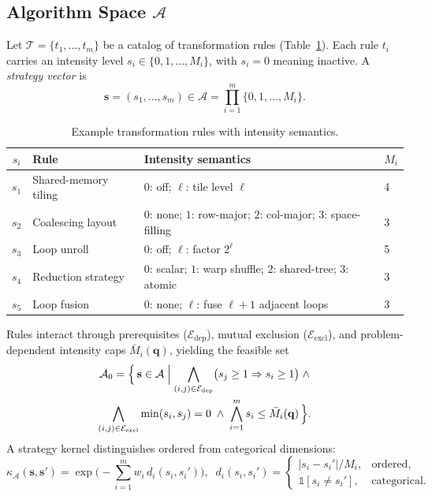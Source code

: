 \documentclass{article}
\begin{document}
\subsection{Algorithm Space $\mathcal{A}$}
Let $\mathcal{T} = \{t_1, \ldots, t_m\}$ be a catalog of
transformation rules (Table~\ref{tab:trans}). Each rule $t_i$ carries
an intensity level $s_i \in \{0, 1, \ldots, M_i\}$, with $s_i = 0$
meaning inactive. A \emph{strategy vector} is
\begin{equation}
\mathbf{s} = (s_1, \ldots, s_m) \in \mathcal{A}
   = \prod_{i=1}^{m}\{0, 1, \ldots, M_i\}.
\label{eq:strategy}
\end{equation}

\begin{table}[ht]
\centering
\small
\caption{Example transformation rules with intensity semantics.}
\label{tab:trans}
\begin{tabular}{@{}clll@{}}
\toprule
$s_i$ & \textbf{Rule} & \textbf{Intensity semantics} & $M_i$ \\
\midrule
$s_1$ & Shared-memory tiling & $0$: off; $\ell$: tile level $\ell$ & 4 \\
$s_2$ & Coalescing layout     & $0$: none; $1$: row-major; $2$: col-major; $3$: space-filling & 3 \\
$s_3$ & Loop unroll           & $0$: off; $\ell$: factor $2^{\ell}$ & 5 \\
$s_4$ & Reduction strategy    & $0$: scalar; $1$: warp shuffle; $2$: shared-tree; $3$: atomic & 3 \\
$s_5$ & Loop fusion           & $0$: none; $\ell$: fuse $\ell{+}1$ adjacent loops & 3 \\
\bottomrule
\end{tabular}
\end{table}

Rules interact through prerequisites ($\mathcal{E}_{\mathrm{dep}}$),
mutual exclusion ($\mathcal{E}_{\mathrm{excl}}$), and
problem-dependent intensity caps $\bar{M}_i(\mathbf{q})$, yielding the
feasible set
\begin{multline}
\mathcal{A}_0 = \Bigl\{\,
  \mathbf{s} \in \mathcal{A} \mathrel{\Big|}
  \bigwedge_{(i,j)\in \mathcal{E}_{\mathrm{dep}}}
    \bigl(s_j \geq 1 \Rightarrow s_i \geq 1\bigr) \;\land \\
  \bigwedge_{(i,j)\in \mathcal{E}_{\mathrm{excl}}}
    \min(s_i, s_j) = 0 \;\land\;
  \bigwedge_{i=1}^{m} s_i \leq \bar{M}_i(\mathbf{q})
\,\Bigr\}.
\label{eq:feasible}
\end{multline}
A strategy kernel distinguishes ordered from categorical dimensions:
\begin{equation}
\kappa_\mathcal{A}(\mathbf{s},\mathbf{s}')
  = \exp\!\Biggl(-\sum_{i=1}^{m} w_i \, d_i(s_i, s_i')\Biggr),\;\;
d_i(s_i, s_i') = \begin{cases}
|s_i - s_i'|/M_i, & \text{ordered},\\
\mathbb{1}[s_i \neq s_i'], & \text{categorical}.
\end{cases}
\label{eq:skernel}
\end{equation}
\end{document}
